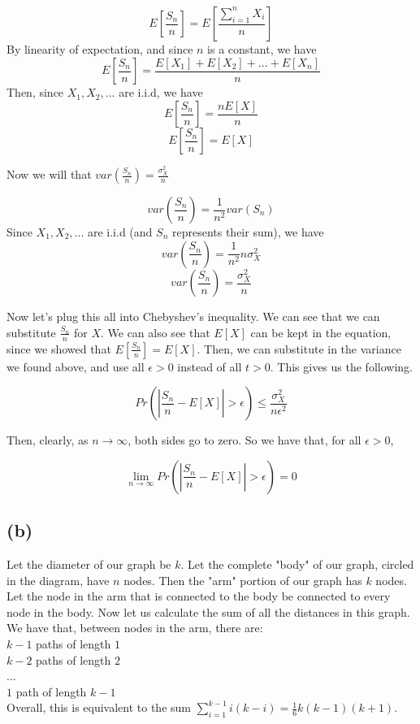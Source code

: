 \documentclass{article}
\begin{document}
\[ E[\frac{S_n}{n}] = E[\frac{\sum_{i = 1}^n X_i}{n}] \]
By linearity of expectation, and since $n$ is a constant, we have
\[ E[\frac{S_n}{n}] =  \frac{E[X_1] + E[X_2] + ... + E[X_n]}{n} \]
Then, since $X_1, X_2, ...$ are i.i.d, we have 
\[ E[\frac{S_n}{n}] =  \frac{nE[X]}{n} \]
\[ E[\frac{S_n}{n}] =  E[X] \]

\noindent Now we will that $var(\frac{S_n}{n}) = \frac{\sigma^2_X}{n}$

\[ var(\frac{S_n}{n}) = \frac{1}{n^2} var(S_n) \]
Since $X_1, X_2, ...$ are i.i.d (and $S_n$ represents their sum), we have
\[ var(\frac{S_n}{n}) = \frac{1}{n^2} n \sigma^2_X \]
\[ var(\frac{S_n}{n}) = \frac{\sigma^2_X}{n} \]

\noindent Now let's plug this all into Chebyshev's inequality. We can see that we can 
substitute $\frac{S_n}{n}$ for $X$. We can also see that $E[X]$ can be kept
in the equation, since we showed that $E[\frac{S_n}{n}] = E[X]$. Then, we 
can substitute in the variance we found above, and use all $\epsilon > 0$ instead
of all $t > 0$. This gives us the following.

\[ Pr(|\frac{S_n}{n} - E[X]| > \epsilon) \leq \frac{\sigma^2_X}{n \epsilon^2} \]

\noindent Then, clearly, as $n \rightarrow \infty$, both sides go to zero. So 
we have that, for all $\epsilon > 0$, 

\[ \lim_{n \rightarrow \infty} Pr(|\frac{S_n}{n} - E[X]| > \epsilon) = 0 \]

\subsection*{(b)}
Let the diameter of our graph be $k$. Let the complete "body" of our graph,
circled in the diagram, have $n$ nodes. Then the "arm" portion of our graph
has $k$ nodes. Let the node in the arm that is connected to the body be connected to
every node in the body. Now let us calculate the sum of all the distances in this graph.
We have that, between nodes in the arm, there are: \\

\noindent $k-1$ paths of length $1$ \\
$k-2$ paths of length $2$ \\
... \\
$1$ path of length $k-1$ \\

\noindent Overall, this is equivalent to the sum $\sum_{i = 1}^{k - 1} i (k - i) = 
\frac{1}{6} k (k - 1)(k + 1)$. \\
\end{document}
